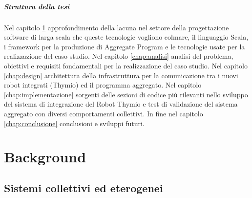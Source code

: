 \documentclass[12pt,a4paper,openright,twoside]{book}
\begin{document}

\paragraph{Struttura della tesi} Nel capitolo \ref{chap:background} approfondimento della lacuna nel settore della progettazione software di larga scala che queste tecnologie vogliono colmare, il linguaggio Scala, i framework per la produzione di Aggregate Program e le tecnologie usate per la realizzazione del caso studio. Nel capitolo \ref{chap:analisi} analisi del problema, obiettivi e requisiti fondamentali per la realizzazione del caso studio. Nel capitolo \ref{chap:design} architettura della infrastruttura per la comunicazione tra i nuovi robot integrati (Thymio) ed il programma aggregato. Nel capitolo \ref{chap:implementazione} sorgenti delle sezioni di codice più rilevanti nello sviluppo del sistema di integrazione del Robot Thymio e test di validazione del sistema aggregato con diversi comportamenti collettivi. In fine nel capitolo \ref{chap:conclusione} conclusioni e sviluppi futuri.

\chapter{Background}
\label{chap:background}



\section{Sistemi collettivi ed eterogenei} 

\end{document}
